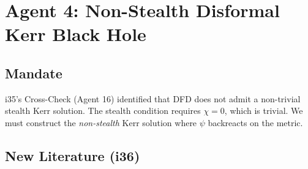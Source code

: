 \documentclass[11pt,a4paper]{article}
\begin{document}
\newpage
\section{Agent 4: Non-Stealth Disformal Kerr Black Hole}
\label{sec:agent4}

\subsection{Mandate}

i35's Cross-Check (Agent 16) identified that DFD does not admit a non-trivial stealth Kerr solution. The stealth condition requires $\chi = 0$, which is trivial. We must construct the \emph{non-stealth} Kerr solution where $\psi$ backreacts on the metric.

\subsection{New Literature (i36)}
\end{document}
